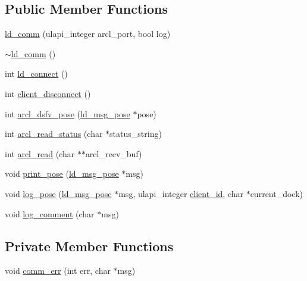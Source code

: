 \subsection*{Public Member Functions}
\begin{DoxyCompactItemize}
\item 
\mbox{\hyperlink{classld__comm_afecf4465db68994a6c4c6024338498c8}{ld\+\_\+comm}} (ulapi\+\_\+integer arcl\+\_\+port, bool log)
\item 
\mbox{\hyperlink{classld__comm_af403b74c6732802512b416fdcecef916}{$\sim$ld\+\_\+comm}} ()
\item 
int \mbox{\hyperlink{classld__comm_a8cd32085a2ad22929e381ffce3fed103}{ld\+\_\+connect}} ()
\item 
int \mbox{\hyperlink{classld__comm_ad9a9140d9e21ae6c991dda317808acce}{client\+\_\+disconnect}} ()
\item 
int \mbox{\hyperlink{classld__comm_a735b4f8a86715cd2fde806ae6f7ba6b3}{arcl\+\_\+dsfv\+\_\+pose}} (\mbox{\hyperlink{structld__msg__pose}{ld\+\_\+msg\+\_\+pose}} $\ast$pose)
\item 
int \mbox{\hyperlink{classld__comm_a936a049861974c0ffa5d836a1364aa03}{arcl\+\_\+read\+\_\+status}} (char $\ast$status\+\_\+string)
\item 
int \mbox{\hyperlink{classld__comm_afaca1d34911ee06e0b8d07efd3a074d3}{arcl\+\_\+read}} (char $\ast$$\ast$arcl\+\_\+recv\+\_\+buf)
\item 
void \mbox{\hyperlink{classld__comm_aceb15ae4635e8033ec46cb1a54a99c1f}{print\+\_\+pose}} (\mbox{\hyperlink{structld__msg__pose}{ld\+\_\+msg\+\_\+pose}} $\ast$msg)
\item 
void \mbox{\hyperlink{classld__comm_a4f3f33cd1ad222ab4d0bf8cc114d530b}{log\+\_\+pose}} (\mbox{\hyperlink{structld__msg__pose}{ld\+\_\+msg\+\_\+pose}} $\ast$msg, ulapi\+\_\+integer \mbox{\hyperlink{classld__comm_ab48ea91f4f13b276a1e65fe5edd1ab15}{client\+\_\+id}}, char $\ast$current\+\_\+dock)
\item 
void \mbox{\hyperlink{classld__comm_ad47e957c7397e42e82128ee143d8b143}{log\+\_\+comment}} (char $\ast$msg)
\end{DoxyCompactItemize}
\subsection*{Private Member Functions}
\begin{DoxyCompactItemize}
\item 
void \mbox{\hyperlink{classld__comm_a311097d66efbc4d7d765945ed5857675}{comm\+\_\+err}} (int err, char $\ast$msg)
\end{DoxyCompactItemize}
